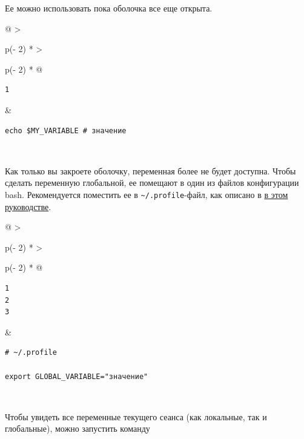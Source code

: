 \documentclass{report}
\begin{document}
Ее можно использовать пока оболочка все еще открыта.

\begin{longtable}[]{@{}
  >{\raggedright\arraybackslash}p{(\columnwidth - 2\tabcolsep) * }
  >{\raggedright\arraybackslash}p{(\columnwidth - 2\tabcolsep) * }@{}}
\toprule
\endhead
\begin{minipage}[t]{\linewidth}\raggedright
\begin{verbatim}
1
\end{verbatim}
\end{minipage} & \begin{minipage}[t]{\linewidth}\raggedright
\begin{verbatim}
echo $MY_VARIABLE # значение
\end{verbatim}
\end{minipage} \\ \addlinespace
\bottomrule
\end{longtable}

Как только вы закроете оболочку, переменная более не будет доступна.
Чтобы сделать переменную глобальной, ее помещают в один из файлов
конфигурации bash. Рекомендуется поместить ее в
\texttt{\textasciitilde{}/.profile}-файл, как описано в
\href{blog/2019/user-permissions/}{в этом руководстве}.

\begin{longtable}[]{@{}
  >{\raggedright\arraybackslash}p{(\columnwidth - 2\tabcolsep) * }
  >{\raggedright\arraybackslash}p{(\columnwidth - 2\tabcolsep) * }@{}}
\toprule
\endhead
\begin{minipage}[t]{\linewidth}\raggedright
\begin{verbatim}
1
2
3
\end{verbatim}
\end{minipage} & \begin{minipage}[t]{\linewidth}\raggedright
\begin{verbatim}
# ~/.profile

export GLOBAL_VARIABLE="значение"
\end{verbatim}
\end{minipage} \\ \addlinespace
\bottomrule
\end{longtable}

Чтобы увидеть все переменные текущего сеанса (как локальные, так и
глобальные), можно запустить команду
\end{document}

